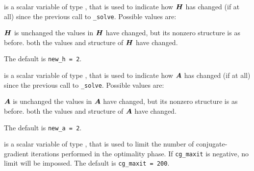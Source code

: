 \begin{description}





 is a scalar variable of type \integer, that is used
to indicate how ${\bm{H}}$ has changed (if at all) since the previous call
to {\tt \packagename\_solve}. Possible values are:
\begin{description}
 ${\bm{H}}$ is unchanged
 the values in ${\bm{H}}$ have changed, but its nonzero structure 
is as before.
 both the values and structure of ${\bm{H}}$ have changed.
\end{description}
The default is {\tt new\_h = 2}.

 is a scalar variable of type \integer, that is used
to indicate how ${\bm{A}}$ has changed (if at all) since the previous call
to {\tt \packagename\_solve}. Possible values are:
\begin{description}
 ${\bm{A}}$ is unchanged
 the values in ${\bm{A}}$ have changed, but its nonzero structure 
is as before.
 both the values and structure of ${\bm{A}}$ have changed.
\end{description}
The default is {\tt new\_a = 2}.

 is a scalar variable of type \integer, that is used
to limit the number of conjugate-gradient iterations performed in 
the optimality phase. If 
{\tt cg\_maxit} is negative, no limit will be impossed. The default
is {\tt cg\_maxit = 200}.


\end{description}
